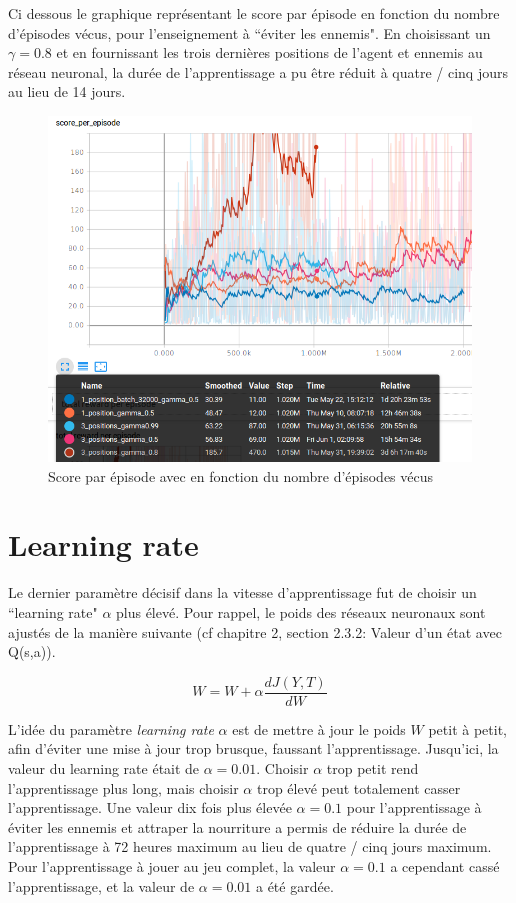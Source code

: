 \documentclass[11pt,a4paper]{report}
\begin{document}
   \newpage
   \par Ci dessous le graphique représentant le score par épisode en fonction du nombre d'épisodes vécus, pour l'enseignement à ``éviter les ennemis". En choisissant un $\gamma = 0.8$ et en fournissant les trois dernières positions de l'agent et ennemis au réseau neuronal, la durée de l'apprentissage a pu être réduit à quatre / cinq jours au lieu de 14 jours. 
   
   \begin{figure}[!h]
   \center
   \includegraphics[scale=0.5]{ressources/input_size_gamma.png}
   \caption{Score par épisode avec en fonction du nombre d'épisodes vécus}
   \end{figure} 
   
   \newpage
   \section{Learning rate}
   
   \par Le dernier paramètre décisif dans la vitesse d'apprentissage fut de choisir un ``learning rate" $\alpha$ plus élevé. Pour rappel, le poids des réseaux neuronaux sont ajustés de la manière suivante (cf chapitre 2, section 2.3.2: Valeur d’un état avec Q(s,a)). 
   
   $$W = W + \alpha \frac{dJ(Y,T)}{dW}$$
   
   \par L'idée du paramètre \textit{learning rate} $\alpha$ est de mettre à jour le poids $W$ petit à petit, afin d'éviter une mise à jour trop brusque, faussant l'apprentissage. Jusqu'ici, la valeur du learning rate était de $\alpha = 0.01$. Choisir $\alpha$ trop petit rend l'apprentissage plus long, mais choisir $\alpha$ trop élevé peut totalement casser l'apprentissage. Une valeur dix fois plus élevée $\alpha = 0.1$ pour l'apprentissage à éviter les ennemis et attraper la nourriture a permis de réduire la durée de l'apprentissage à 72 heures maximum au lieu de quatre / cinq jours maximum. Pour l'apprentissage à jouer au jeu complet, la valeur $\alpha = 0.1$ a cependant cassé l'apprentissage, et la valeur de $\alpha = 0.01$ a été gardée. 
   
\end{document}
